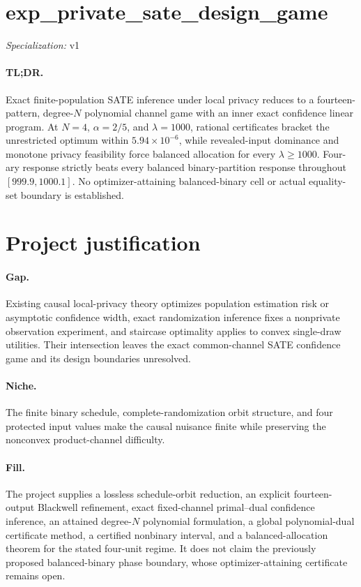 \documentclass{article}
\begin{document}
\sloppy

\section*{exp\_\allowbreak{}private\_\allowbreak{}sate\_\allowbreak{}design\_\allowbreak{}game}

\noindent\textit{Specialization:} v1\par

\paragraph{TL;DR.} Exact finite-population SATE inference under local privacy reduces to a fourteen-pattern, degree-\(N\) polynomial channel game with an inner exact confidence linear program. At \(N=4\), \(\alpha=2/5\), and \(\lambda=1000\), rational certificates bracket the unrestricted optimum within \(5.94\times10^{-6}\), while revealed-input dominance and monotone privacy feasibility force balanced allocation for every \(\lambda\ge1000\). Four-ary response strictly beats every balanced binary-partition response throughout \([999.9,1000.1]\). No optimizer-attaining balanced-binary cell or actual equality-set boundary is established.

\section{Project justification}

\paragraph{Gap.} Existing causal local-privacy theory optimizes population estimation risk or asymptotic confidence width, exact randomization inference fixes a nonprivate observation experiment, and staircase optimality applies to convex single-draw utilities. Their intersection leaves the exact common-channel SATE confidence game and its design boundaries unresolved.

\paragraph{Niche.} The finite binary schedule, complete-randomization orbit structure, and four protected input values make the causal nuisance finite while preserving the nonconvex product-channel difficulty.

\paragraph{Fill.} The project supplies a lossless schedule-orbit reduction, an explicit fourteen-output Blackwell refinement, exact fixed-channel primal--dual confidence inference, an attained degree-\(N\) polynomial formulation, a global polynomial-dual certificate method, a certified nonbinary interval, and a balanced-allocation theorem for the stated four-unit regime. It does not claim the previously proposed balanced-binary phase boundary, whose optimizer-attaining certificate remains open.
\end{document}
